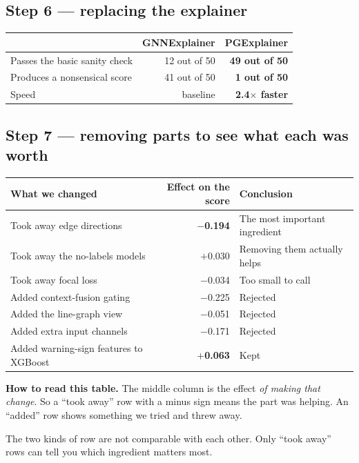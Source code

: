 \documentclass[11pt,a4paper]{article}
\begin{document}
\subsection{Step 6 --- replacing the explainer}

\begin{center}\small
\begin{tabular}{@{}lrr@{}}
\toprule
 & \textbf{GNNExplainer} & \textbf{PGExplainer} \\
\midrule
Passes the basic sanity check & 12 out of 50 & \textbf{49 out of 50} \\
Produces a nonsensical score & 41 out of 50 & \textbf{1 out of 50} \\
Speed & baseline & \textbf{2.4$\times$ faster} \\
\bottomrule
\end{tabular}
\end{center}

\subsection{Step 7 --- removing parts to see what each was worth}

\begin{center}\small
\begin{tabular}{@{}lrl@{}}
\toprule
\textbf{What we changed} & \textbf{Effect on the score} & \textbf{Conclusion} \\
\midrule
Took away edge directions & \textbf{$-$0.194} & The most important ingredient \\
Took away the no-labels models & $+$0.030 & Removing them actually helps \\
Took away focal loss & $-$0.034 & Too small to call \\
Added context-fusion gating & $-$0.225 & Rejected \\
Added the line-graph view & $-$0.051 & Rejected \\
Added extra input channels & $-$0.171 & Rejected \\
Added warning-sign features to XGBoost & \textbf{$+$0.063} & Kept \\
\bottomrule
\end{tabular}
\end{center}

\begin{plain}
\textbf{How to read this table.} The middle column is the effect \emph{of making
that change}. So a ``took away'' row with a minus sign means the part was
helping. An ``added'' row shows something we tried and threw away.

The two kinds of row are not comparable with each other. Only ``took away'' rows
can tell you which ingredient matters most.
\end{plain}
\end{document}
